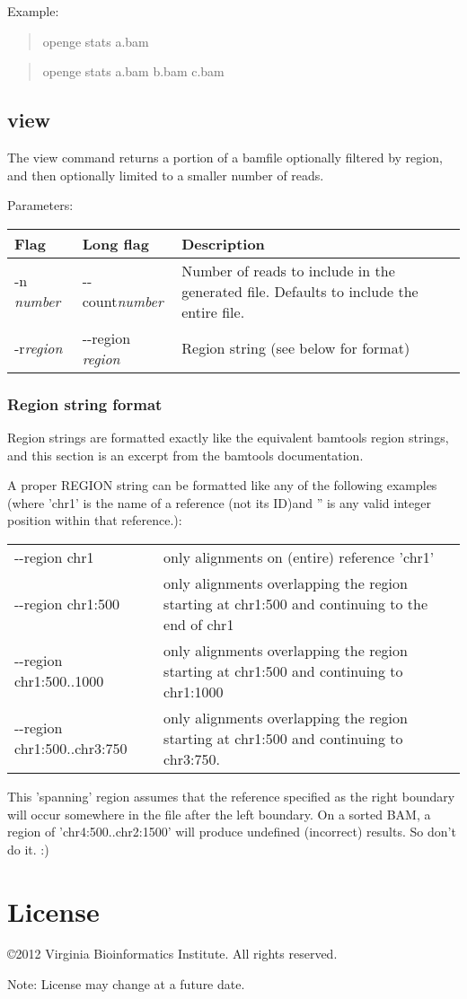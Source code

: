 \documentclass[11pt]{article}
\newcommand {\cmd}[1] {\begin{quote}#1\end{quote}}
\begin{document}
Example:

\cmd{openge stats a.bam}
\cmd{openge stats a.bam b.bam c.bam}
\subsection{view}
The view command returns a portion of a bamfile optionally filtered by region, and then optionally limited to a smaller number of reads.

Parameters:
\begin{center}
\begin{tabular}{llp{3.5in}}
\hline
Flag&Long flag&Description\\ \hline
-n \textit{number}&{-}{-}count\textit{number}&Number of reads to include in the generated file. Defaults to include the entire file.\\
-r\textit{region}&{-}{-}region \textit{region}&Region string (see below for format)\\
\end{tabular}
\end{center}

\subsubsection{Region string format}
Region strings are formatted exactly like the equivalent bamtools region strings, and this section is an excerpt from the bamtools documentation.

A proper REGION string can be formatted like any of the following examples (where 'chr1' is the name of a reference (not its ID)and '' is any valid integer position within that reference.):

\begin{center}
\begin{tabular}{lp{3.5in}}
{-}{-}region chr1&only alignments on (entire) reference 'chr1'\\
{-}{-}region chr1:500&only alignments overlapping the region starting at chr1:500 and continuing to the end of chr1\\
{-}{-}region chr1:500..1000&only alignments overlapping the region starting at chr1:500 and continuing to chr1:1000\\
{-}{-}region chr1:500..chr3:750&only alignments overlapping the region starting at chr1:500 and continuing to chr3:750.\\
\end{tabular}
\end{center}

This 'spanning' region assumes that the reference specified as the right boundary will occur somewhere in the file after the left boundary. On a sorted BAM, a region of 'chr4:500..chr2:1500' will produce undefined (incorrect) results. So don't do it. :)

\section {License}
\copyright 2012 Virginia Bioinformatics Institute. All rights reserved.

Note: License may change at a future date.
\end{document}
